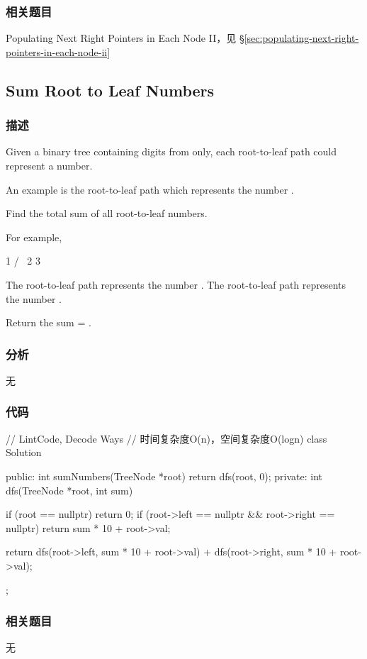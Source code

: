 \subsubsection{相关题目}
\begindot
\item Populating Next Right Pointers in Each Node II，见 \S \ref{sec:populating-next-right-pointers-in-each-node-ii}
\myenddot


\subsection{Sum Root to Leaf Numbers} %
\label{sec:sum-root-to-leaf-numbers}


\subsubsection{描述}
Given a binary tree containing digits from  only, each root-to-leaf path could represent a number.

An example is the root-to-leaf path  which represents the number .

Find the total sum of all root-to-leaf numbers.

For example,
\begin{Code}
    1
   / \
  2   3
\end{Code}

The root-to-leaf path  represents the number .
The root-to-leaf path  represents the number .

Return the sum = .


\subsubsection{分析}
无

\subsubsection{代码}

\begin{Code}
// LintCode, Decode Ways
// 时间复杂度O(n)，空间复杂度O(logn)
class Solution {
public:
    int sumNumbers(TreeNode *root) {
        return dfs(root, 0);
    }
private:
    int dfs(TreeNode *root, int sum) {
        if (root == nullptr) return 0;
        if (root->left == nullptr && root->right == nullptr)
            return sum * 10 + root->val;

        return dfs(root->left, sum * 10 + root->val) +
                dfs(root->right, sum * 10 + root->val);
    }
};
\end{Code}


\subsubsection{相关题目}
\begindot
\item 无
\myenddot
